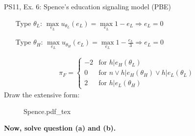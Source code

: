 \begin{frame}{PS11, Ex. 6: Spence’s education signaling model (PBE)}
\begin{multicols}{2}
\begin{itemize}
        \item[Type $\theta_L$:] $\max\limits_{e_L}u_{\theta_L}(e_L)=\max\limits_{e_L}1-e_L\Rightarrow e_L=0$\\
        \item[Type $\theta_H$:] $\max\limits_{e_L}u_{\theta_H}(e_L)=\max\limits_{e_L}1-\frac{e_L}{3}\Rightarrow e_L=0$
      \end{itemize}\vspace{-12pt}
      \begin{align*}
        \pi_{F}=\left\{\begin{array}{rl}
           -2 & \text{for }h|e_H(\theta_L) \\
            0 & \text{for }n\vee h|e_H(\theta_H)\vee h|e_L(\theta_L) \\
            2 & \text{for }h|e_L(\theta_H)
        \end{array}\right.
      \end{align*}
      \vfill\null\columnbreak
      Draw the extensive form:\vspace{-14pt}
      \begin{figure}[!h]
        \center{}
        {Spence.pdf_tex}
      \end{figure}\vspace{-4pt}
      \textbf{Now, solve question (a) and (b).}
      \vfill\null
    \end{multicols}
\end{frame}

